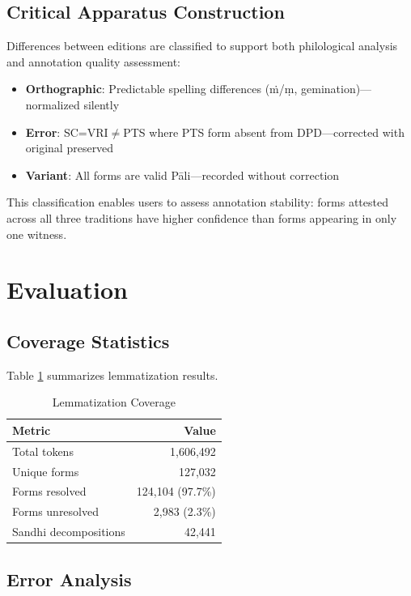 \documentclass[11pt,twocolumn]{article}
\begin{document}
\subsection{Critical Apparatus Construction}

Differences between editions are classified to support both philological analysis and annotation quality assessment:

\begin{itemize}
\item \textbf{Orthographic}: Predictable spelling differences (ṁ/ṃ, gemination)---normalized silently
\item \textbf{Error}: SC=VRI$\neq$PTS where PTS form absent from DPD---corrected with original preserved
\item \textbf{Variant}: All forms are valid Pāli---recorded without correction
\end{itemize}

This classification enables users to assess annotation stability: forms attested across all three traditions have higher confidence than forms appearing in only one witness.

\section{Evaluation}
\label{sec:eval}

\subsection{Coverage Statistics}

Table \ref{tab:coverage} summarizes lemmatization results.

\begin{table}[ht]
\centering
\caption{Lemmatization Coverage}
\label{tab:coverage}
\begin{tabular}{lr}
\toprule
Metric & Value \\
\midrule
Total tokens & 1,606,492 \\
Unique forms & 127,032 \\
Forms resolved & 124,104 (97.7\%) \\
Forms unresolved & 2,983 (2.3\%) \\
Sandhi decompositions & 42,441 \\
\bottomrule
\end{tabular}
\end{table}

\subsection{Error Analysis}
\end{document}
